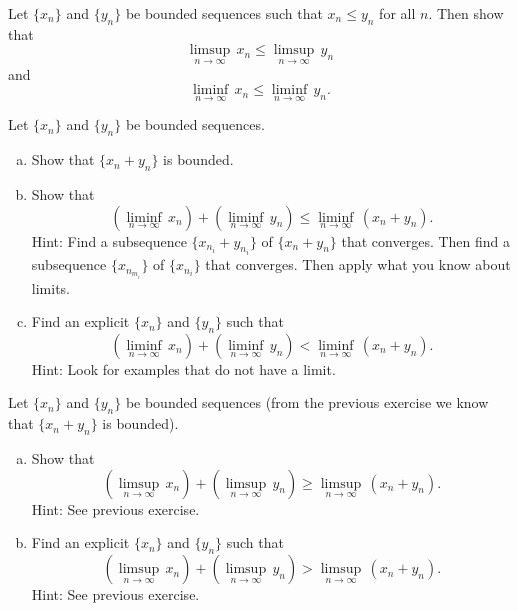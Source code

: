 \begin{exercise}
Let $\{ x_n \}$ and $\{ y_n \}$ be bounded sequences such that
$x_n \leq y_n$ for all $n$.  Then show that
\begin{equation*}
\limsup_{n\to\infty} \, x_n \leq
\limsup_{n\to\infty} \, y_n
\end{equation*}
and
\begin{equation*}
\liminf_{n\to\infty} \, x_n \leq
\liminf_{n\to\infty} \, y_n .
\end{equation*}
\end{exercise}

\begin{exercise}
Let $\{ x_n \}$ and $\{ y_n \}$ be bounded sequences.
\begin{enumerate}[a)]
\item
Show that $\{ x_n + y_n \}$ is bounded.
\item
Show that
\begin{equation*}
(\liminf_{n\to \infty}\, x_n)
+
(\liminf_{n\to \infty}\, y_n)
\leq
\liminf_{n\to \infty}\, (x_n+y_n) .
\end{equation*}
Hint: Find a subsequence $\{ x_{n_i}+y_{n_i} \}$ of $\{ x_n + y_n \}$
that converges.
Then find a subsequence $\{ x_{n_{m_i}} \}$ of $\{ x_{n_i} \}$ that converges.
Then apply what you know about limits.
\item
Find an explicit $\{ x_n \}$ and $\{ y_n \}$ such that
\begin{equation*}
(\liminf_{n\to \infty}\, x_n)
+
(\liminf_{n\to \infty}\, y_n)
<
\liminf_{n\to \infty}\, (x_n+y_n) .
\end{equation*}
Hint: Look for examples that do not have a limit.
\end{enumerate}
\end{exercise}

\begin{samepage}
\begin{exercise}
Let $\{ x_n \}$ and $\{ y_n \}$ be bounded sequences (from the previous
exercise we know that $\{ x_n + y_n \}$ is bounded).
\begin{enumerate}[a)]
\item
Show that
\begin{equation*}
(\limsup_{n\to \infty}\, x_n)
+
(\limsup_{n\to \infty}\, y_n)
\geq
\limsup_{n\to \infty}\, (x_n+y_n) .
\end{equation*}
Hint: See previous exercise.
\item
Find an explicit $\{ x_n \}$ and $\{ y_n \}$ such that
\begin{equation*}
(\limsup_{n\to \infty}\, x_n)
+
(\limsup_{n\to \infty}\, y_n)
>
\limsup_{n\to \infty}\, (x_n+y_n) .
\end{equation*}
Hint: See previous exercise.
\end{enumerate}
\end{exercise}
\end{samepage}

